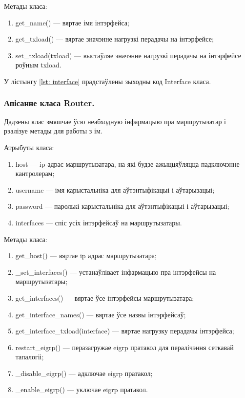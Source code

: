 Метады класа:
\begin{enumerate}
    \item get\_name() --- вяртае імя інтэрфейса;
    \item get\_txload() --- вяртае значэнне нагрузкі перадачы на інтэрфейсе;
    \item set\_txload(txload) --- выстаўляе значэнне нагрузкі перадачы на інтэрфейсе
    роўным txload.
\end{enumerate}

У лістынгу \ref{lst: interface} прадстаўлены зыходны код Interface класа.



\subsubsection{Апісанне класа Router.}

Дадзены клас змяшчае ўсю неабходную інфармацыю пра маршрутызатар і рэалізуе
метады для работы з ім.

Атрыбуты класа:
\begin{enumerate}
    \item host --- ip адрас маршрутызатара, на які будзе ажыццяўляцца падключэнне кантролерам;
    \item username --- імя карыстальніка для аўтэнтыфікацыі і аўтарызацыі;
    \item password --- паролькі карыстальніка для аўтэнтыфікацыі і аўтарызацыі;
    \item interfaces --- спіс усіх інтэрфейсаў на маршрутызатары.
\end{enumerate}

Метады класа:
\begin{enumerate}
    \item get\_host() --- вяртае ip адрас маршрутызатара;
    \item \_set\_interfaces() --- устанаўлівает інфармацыю пра інтэрфейсы на маршрутызатары;
    \item get\_interfaces() --- вяртае ўсе інтэрфейсы маршрутызатара;
    \item get\_interface\_names() --- вяртае ўсе назвы інтэрфейсаў;
    \item get\_interface\_txload(interface) --- вяртае нагрузку перадачы інтэрфейса;
    \item restart\_eigrp() --- перазагружае eigrp пратакол для пералічэння сеткавай тапалогіі;
    \item \_disable\_eigrp() --- адключае eigrp пратакол;
    \item \_enable\_eigrp() --- уключае eigrp пратакол.
\end{enumerate}

